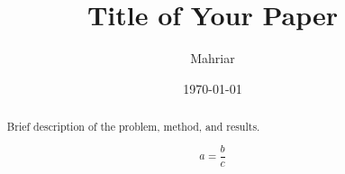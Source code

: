 \documentclass[11pt]{article}
\title{Title of Your Paper}
\author{Mahriar}
\date{\today}
\begin{document}
\maketitle

\begin{abstract}
Brief description of the problem, method, and results.

\[ a = \frac{b}{c} \]

\end{abstract}


\newpage

\newpage

\newpage


% 
% 
\end{document}
